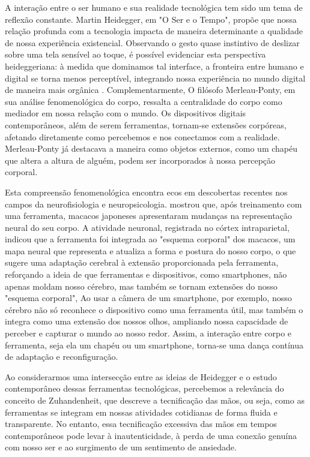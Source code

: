 A interação entre o ser humano e sua realidade tecnológica tem sido um tema de reflexão constante. Martin Heidegger, em "O Ser e o Tempo", propõe que nossa relação profunda com a tecnologia impacta de maneira determinante a qualidade de nossa experiência existencial. Observando o gesto quase instintivo de deslizar sobre uma tela sensível ao toque, é possível evidenciar esta perspectiva heideggeriana: à medida que dominamos tal interface, a fronteira entre humano e digital se torna menos perceptível, integrando nossa experiência no mundo digital de maneira mais orgânica \cite{2012_Silva_DISSERTATION}. Complementarmente, O filósofo Merleau-Ponty, em sua análise fenomenológica do corpo, ressalta a centralidade do corpo como mediador em nossa relação com o mundo. Os dispositivos digitais contemporâneos, além de serem ferramentas, tornam-se extensões corpóreas, afetando diretamente como percebemos e nos conectamos com a realidade. Merleau-Ponty já destacava a maneira como objetos externos, como um chapéu que altera a altura de alguém, podem ser incorporados à nossa percepção corporal. 

Esta compreensão fenomenológica encontra ecos em descobertas recentes nos campos da neurofisiologia e neuropsicologia.  mostrou que, após treinamento com uma ferramenta, macacos japoneses apresentaram mudanças na representação neural do seu corpo. A atividade neuronal, registrada no córtex intraparietal, indicou que a ferramenta foi integrada ao "esquema corporal" dos macacos, um mapa neural que representa e atualiza a forma e postura do nosso corpo, o que sugere uma adaptação cerebral à extensão proporcionada pela ferramenta, reforçando a ideia de que ferramentas e dispositivos, como smartphones, não apenas moldam nosso cérebro, mas também se tornam extensões do nosso "esquema corporal",  Ao usar a câmera de um smartphone, por exemplo, nosso cérebro não só reconhece o dispositivo como uma ferramenta útil, mas também o integra como uma extensão dos nossos olhos, ampliando nossa capacidade de perceber e capturar o mundo ao nosso redor. Assim, a interação entre corpo e ferramenta, seja ela um chapéu ou um smartphone, torna-se uma dança contínua de adaptação e reconfiguração.

Ao considerarmos uma intersecção entre as ideias de Heidegger e o estudo contemporâneo dessas ferramentas tecnológicas, percebemos a relevância do conceito de Zuhandenheit, que descreve a tecnificação das mãos, ou seja, como as ferramentas se integram em nossas atividades cotidianas de forma fluida e transparente. No entanto, essa tecnificação excessiva das mãos em tempos contemporâneos pode levar à inautenticidade, à perda de uma conexão genuína com nosso ser e ao surgimento de um sentimento de ansiedade.

